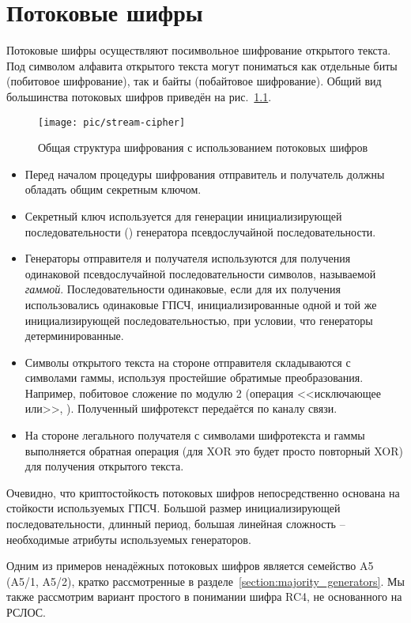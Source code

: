 \chapter{Потоковые шифры}\label{chapter-stream-ciphers}

Потоковые шифры осуществляют посимвольное шифрование открытого текста. Под символом алфавита открытого текста могут пониматься как отдельные биты (побитовое шифрование), так и байты (побайтовое шифрование). Общий вид большинства потоковых шифров приведён на рис.~\ref{fig:stream-cipher}.

\begin{figure}[hb]
	\centering
	\texttt{[image: pic/stream-cipher]}
  \caption{Общая структура шифрования с использованием потоковых шифров}
  \label{fig:stream-cipher}
\end{figure}

\begin{itemize}
	\item Перед началом процедуры шифрования отправитель и получатель должны обладать общим секретным ключом.
	\item Секретный ключ используется для генерации инициализирующей последовательности () генератора псевдослучайной последовательности.
	\item Генераторы отправителя и получателя используются для получения одинаковой псевдослучайной последовательности символов, называемой \emph{гаммой}. Последовательности одинаковые, если для их получения использовались одинаковые ГПСЧ, инициализированные одной и той же инициализирующей последовательностью, при условии, что генераторы детерминированные.
	\item Символы открытого текста на стороне отправителя складываются с символами гаммы, используя простейшие обратимые преобразования. Например, побитовое сложение по модулю 2 (операция <<исключающее или>>, ). Полученный шифротекст передаётся по каналу связи.
	\item На стороне легального получателя с символами шифротекста и гаммы выполняется обратная операция (для XOR это будет просто повторный XOR) для получения открытого текста.
\end{itemize}

Очевидно, что криптостойкость потоковых шифров непосредственно основана на стойкости используемых ГПСЧ. Большой размер инициализирующей последовательности, длинный период, большая линейная сложность -- необходимые атрибуты используемых генераторов.

Одним из примеров ненадёжных потоковых шифров является семейство A5 (A5/1, A5/2), кратко рассмотренные в разделе~\ref{section:majority_generators}. Мы также рассмотрим вариант простого в понимании шифра RC4, не основанного на РСЛОС.


